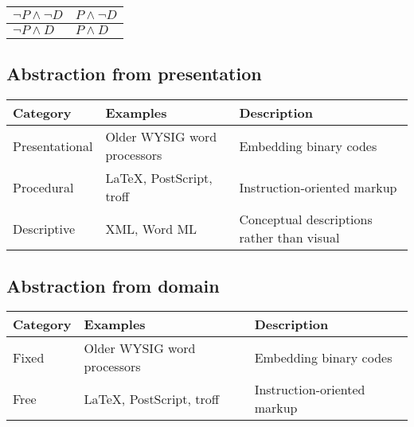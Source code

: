 \documentclass{scrreprt}
\begin{document}
\begin{tabular}{ l | l }
    \(\neg P \wedge \neg D\) &
    \(P \wedge \neg D\) \\
    \hline
    \(\neg P \wedge D\) &
    \(P \wedge D\)
\end{tabular}




\subsection{Abstraction from presentation}

\begin{tabular}{ l | l | l }
  \textbf{Category} &
  \textbf{Examples} &
  \textbf{Description}
  \\ \hline

  Presentational
  & Older WYSIG word processors
  & Embedding binary codes
  \\


  Procedural
  & \LaTeX, PostScript, troff
  & Instruction-oriented markup
  \\


  Descriptive
  & XML, Word ML
  & Conceptual descriptions rather than visual
  \\
\end{tabular}


\subsection{Abstraction from domain}

\begin{tabular}{ l | l | l }
  \textbf{Category} &
  \textbf{Examples} &
  \textbf{Description}
  \\ \hline

  Fixed
  & Older WYSIG word processors
  & Embedding binary codes
  \\


  Free
  & \LaTeX, PostScript, troff
  & Instruction-oriented markup
  \\

\end{tabular}







%
%
%
%

\end{document}
